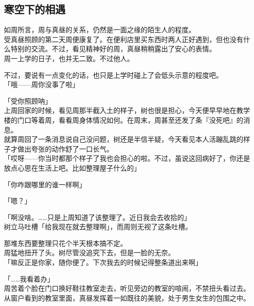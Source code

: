 \subsection{寒空下的相遇}

如周所言，周与真昼的关系，仍然是一面之缘的陌生人的程度。\\

受真昼照顾的第二天周便康复了。在便利店里买东西时两人正好遇到，但也没有什么特别的交流。不过，看见精神好的周，真昼稍稍露出了安心的表情。\\

周一上学的日子，也并无二致。不过他人。

不过，要说有一点变化的话，也只是上学时碰上了会低头示意的程度吧。\\

「哦——周你没事了啦」

「受你照顾呐」\\

上周回家的时候，看见周那半截入土的样子，树也很是担心，今天便早早地在教学楼的门口等着周，看看周身体情况如何。在周末，周甚至还发了条『没死吧』的消息。\\

就算周回了一条消息说自己没问题，树还是半信半疑，今天看见本人活蹦乱跳的样子才做出夸张的动作舒了一口长气。\\

「哎呀——你当时都那个样子了我也会担心的啦。不过，虽说这回病好了，你还是放点心思在生活上吧。比如整理屋子什么的」

「你咋跟哪里的谁一样啊」

「嗯？」

「啊没啥。……只是上周知道了该整理了。近日我会去收拾的」\\

树立马吐槽「给我现在就去整理啊」，而周则无视了这条吐槽。

那堆东西要整理只花个半天根本搞不定。\\

周猛地扭开了头。树尽管没追究下去，但是一脸的无奈。\\

「嘛反正是你家，随你便了。下次我去的时候记得整条道出来啊」

「……我看着办」\\

周苦着个脸在门口换好鞋往教室走去，听见旁边的教室的喧闹，不禁扭头看过去。\\

从窗户看到的教室里面，真昼发挥着一如既往的美貌，处于男生女生的包围之中。

